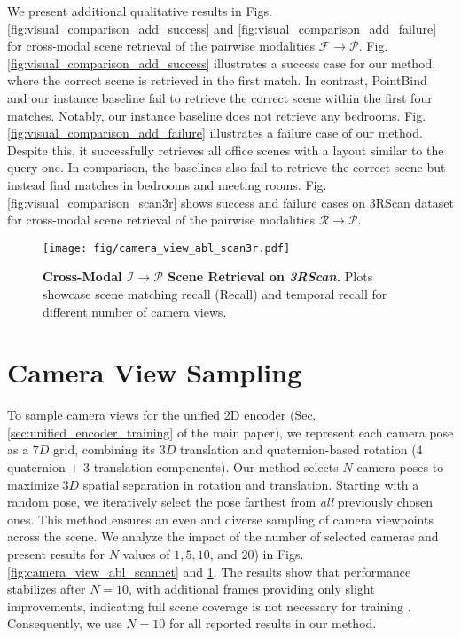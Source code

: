 We present additional qualitative results in Figs. \ref{fig:visual_comparison_add_success} and \ref{fig:visual_comparison_add_failure} for cross-modal scene retrieval of the pairwise modalities $\mathcal{F} \rightarrow \mathcal{P}$. Fig. \ref{fig:visual_comparison_add_success} illustrates a success case for our method, where the correct scene is retrieved in the first match. In contrast, PointBind~\cite{pointbind} and our instance baseline fail to retrieve the correct scene within the first four matches. Notably, our instance baseline does not retrieve any bedrooms. Fig. \ref{fig:visual_comparison_add_failure} illustrates a failure case of our method. Despite this, it successfully retrieves all office scenes with a layout similar to the query one. In comparison, the baselines also fail to retrieve the correct scene but instead find matches in bedrooms and meeting rooms. Fig. \ref{fig:visual_comparison_scan3r} shows success and failure cases on 3RScan dataset for cross-modal scene retrieval of the pairwise modalities $\mathcal{R} \rightarrow \mathcal{P}$.

\begin{figure}
    \centering
    \texttt{[image: fig/camera\_view\_abl\_scan3r.pdf]}
    \vspace{-20pt}
    \caption{\textbf{Cross-Modal $\mathcal{I} \rightarrow \mathcal{P}$ Scene Retrieval on \textit{3RScan}.} Plots showcase scene matching recall (Recall) and temporal recall for different number of camera views.}
    \label{fig:camera_view_abl_scan3r}
\end{figure}
\vspace{-2pt}

\section{Camera View Sampling}
\label{sec:cam_view_sampling}

To sample camera views for the unified 2D encoder (Sec. \ref{sec:unified_encoder_training} of the main paper), we represent each camera pose as a $7D$ grid, combining its $3D$ translation and quaternion-based rotation ($4$ quaternion $+$ $3$ translation components). Our method selects $N$ camera poses to maximize $3D$ spatial separation in rotation and translation. Starting with a random pose, we iteratively select the pose farthest from \textit{all} previously chosen ones. This method ensures an even and diverse sampling of camera viewpoints across the scene. We analyze the impact of the number of selected cameras and present results for $N$ values of $1, 5, 10$, and $20$) in Figs. \ref{fig:camera_view_abl_scannet} and \ref{fig:camera_view_abl_scan3r}. The results show that performance stabilizes after $N=10$, with additional frames providing only slight improvements, indicating full scene coverage is not necessary for training \project{}. Consequently, we use $N=10$ for all reported results in our method.

